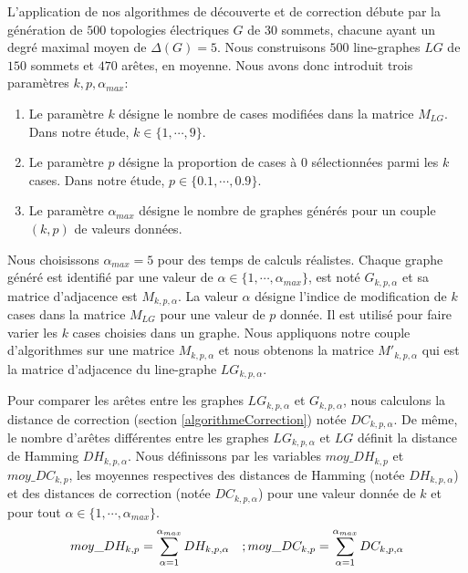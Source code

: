 L'application de nos algorithmes de d\'ecouverte et de correction d\'ebute par la g\'en\'eration de $500$ topologies \'electriques $G$ de $30$ sommets, chacune ayant un degr\'e maximal moyen de  $\Delta(G) = 5$.
Nous construisons $500$ line-graphes $LG$ de $150$ sommets et $470$ ar\^etes, en moyenne. \newline
Nous avons donc introduit trois param\`etres $k, p,  \alpha_{max}$:
\begin{enumerate}
\item Le param\`etre $k$ d\'esigne le nombre de cases modifi\'ees dans la matrice $M_{LG}$. Dans notre \'etude, $k \in \{1,\cdots,9\}$.
\item Le param\`etre $p$ d\'esigne la proportion de cases \`a $0$ s\'electionn\'ees parmi les $k$ cases. Dans notre \'etude, $p \in \{0.1,\cdots,0.9\}$.
\item Le param\`etre $\alpha_{max}$ d\'esigne le nombre de graphes g\'en\'er\'es pour un couple  $(k, p)$ de valeurs donn\'ees.
\end{enumerate}
 
Nous  choisissons $\alpha_{max} = 5$ pour des temps de calculs r\'ealistes. 
Chaque graphe g\'en\'er\'e est identifi\'e par une valeur de  $\alpha \in \{1,\cdots, \alpha_{max} \}$, est not\'e $G_{k,p,\alpha}$ et sa matrice d'adjacence est  $M_{k,p,\alpha}$. 
La valeur $\alpha$ d\'esigne l'indice de modification de $k$ cases dans la  matrice $M_{LG}$ pour une valeur de $p$ donn\'ee. Il est utilis\'e pour faire varier les $k$ cases choisies dans un graphe. 
Nous appliquons notre couple d'algorithmes sur une matrice $M_{k,p,\alpha}$ et nous obtenons la matrice $M'_{k,p,\alpha}$ qui est la matrice d'adjacence du line-graphe $LG_{k, p, \alpha}$. 

Pour comparer les ar\^etes entre les graphes $LG_{k,p, \alpha}$ et $G_{k,p, \alpha}$, nous calculons la distance de correction (section \ref{algorithmeCorrection}) not\'ee $DC_{k,p, \alpha}$.
De m\^eme, le nombre d'ar\^etes diff\'erentes entre les graphes $LG_{k,p, \alpha}$ et $LG$ d\'efinit la distance de Hamming $DH_{k,p, \alpha}$.
Nous d\'efinissons par les variables $moy\_DH_{k,p}$ et $moy\_DC_{k,p}$, les moyennes respectives des distances de Hamming (not\'ee $DH_{k,p,\alpha}$) et des distances de correction (not\'ee $DC_{k,p,\alpha}$) pour une valeur donn\'ee de $k$ et pour tout $\alpha \in \{1, \cdots, \alpha_{max}\}$.
\begin{equation}
moy\_DH_{k, p} = \sum_{\alpha = 1}^{ \alpha_{max} } DH_{k, p, \alpha} \hspace{1 em}; 
moy\_DC_{k, p} = \sum_{\alpha = 1}^{ \alpha_{max} } DC_{k, p, \alpha}
\end{equation}

